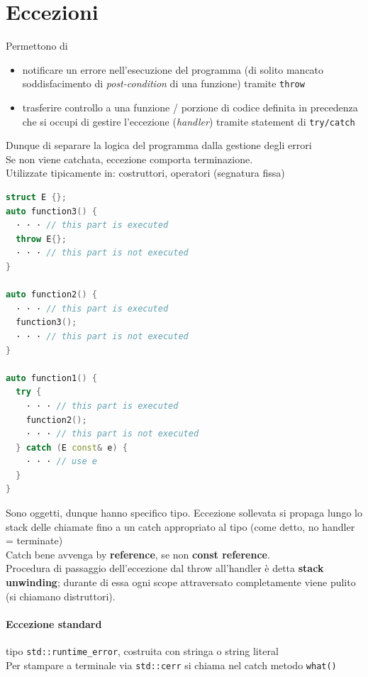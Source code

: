 \documentclass[10pt, oneside]{book}
\begin{document}
\section{Eccezioni}
Permettono di 
\begin{itemize}
\item notificare un errore nell'esecuzione del programma (di solito mancato soddisfacimento di \textit{post-condition} di una funzione) tramite \texttt{throw}
\item trasferire controllo a una funzione / porzione di codice definita in precedenza che si occupi di gestire l'eccezione (\textit{handler}) tramite statement di \texttt{try/catch}
\end{itemize}
Dunque di separare la logica del programma dalla gestione degli errori\\
Se non viene catchata, eccezione comporta terminazione.\\
Utilizzate tipicamente in: costruttori, operatori (segnatura fissa)
\begin{lstlisting}[language=C++]
struct E {};
auto function3() {
  · · · // this part is executed
  throw E{};
  · · · // this part is not executed
}

auto function2() {
  · · · // this part is executed
  function3();
  · · · // this part is not executed
}

auto function1() {
  try {
    · · · // this part is executed
    function2();
    · · · // this part is not executed
  } catch (E const& e) {
    · · · // use e
  }
}
\end{lstlisting}
Sono oggetti, dunque hanno specifico tipo. Eccezione sollevata si propaga lungo lo stack delle chiamate fino a un catch appropriato al tipo (come detto, no handler = terminate)\\
Catch bene avvenga by \textbf{reference}, se non \textbf{const reference}.\\
Procedura di passaggio dell'eccezione dal throw all'handler è detta \textbf{stack unwinding}; durante di essa ogni scope attraversato completamente viene pulito (si chiamano distruttori).

\paragraph{Eccezione standard} tipo \texttt{std::runtime\_error}, costruita con stringa o string literal\\
Per stampare a terminale via \texttt{std::cerr} si chiama nel catch metodo \texttt{what()}
\end{document}
